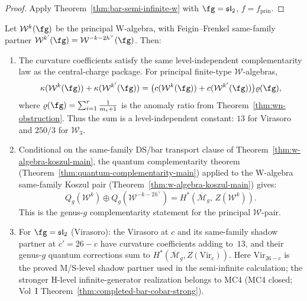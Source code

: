 \begin{proof}
Apply Theorem~\ref{thm:bar-semi-infinite-w} with
$\fg = \mathfrak{sl}_2$, $f = f_{\mathrm{prin}}$.
\end{proof}

\begin{corollary}
\label{cor:anomaly-duality-w}
Let $\mathcal{W}^k(\fg)$ be the principal W-algebra, with
Feigin--Frenkel same-family partner
$\mathcal{W}^{k'}(\fg) = \mathcal{W}^{-k-2h^\vee}(\fg)$.
Then:
\begin{enumerate}[label=\textup{(\alph*)}]
\item The curvature coefficients satisfy the same
level-independent complementarity law as the central-charge
package. For principal finite-type $\mathcal{W}$-algebras,
\[
\kappa(\mathcal{W}^k(\fg)) + \kappa(\mathcal{W}^{k'}(\fg))
= \bigl(c(\mathcal{W}^k(\fg)) + c(\mathcal{W}^{k'}(\fg))\bigr)
\varrho(\fg),
\]
where $\varrho(\fg) = \sum_{i=1}^r \frac{1}{m_i+1}$ is the anomaly
ratio from Theorem~\ref{thm:wn-obstruction}. Thus the sum is a
level-independent constant: $13$ for Virasoro and $250/3$ for
$\mathcal{W}_3$.

\item Conditional on the same-family DS/bar transport clause of
Theorem~\ref{thm:w-algebra-koszul-main}, the quantum complementarity theorem
\textup{(}Theorem~\textup{\ref{thm:quantum-complementarity-main})}
applied to the W-algebra same-family Koszul pair
\textup{(}Theorem~\textup{\ref{thm:w-algebra-koszul-main})} gives:
\[
Q_g(\mathcal{W}^k) \oplus Q_g(\mathcal{W}^{-k-2h^\vee})
= H^*(\overline{\mathcal{M}}_g,\, Z(\mathcal{W}^k)).
\]
This is the genus-$g$ complementarity statement for the principal
$\mathcal{W}$-pair.

\item For $\fg = \mathfrak{sl}_2$
\textup{(}Virasoro\textup{)}: the Virasoro at
$c$ and its same-family shadow partner at $c' = 26 - c$ have
curvature coefficients adding to~$13$, and their
genus-$g$ quantum corrections sum to
 $H^*(\overline{\mathcal{M}}_g, Z(\mathrm{Vir}_c))$. Here
 $\mathrm{Vir}_{26-c}$ is the proved M/S-level shadow partner used in
 the semi-infinite calculation; the stronger H-level
 infinite-generator realization belongs to MC4
 (MC4 closed; Vol~I Theorem~\ref{thm:completed-bar-cobar-strong}).
\end{enumerate}
\end{corollary}

